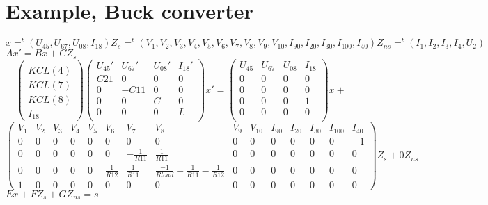 \documentclass[10pt]{article}
\begin{document}
\section{Example, Buck converter}
\begin{figure}[h]
\centerline{
 \scalebox{1.0}{
    
 }
}\end{figure}
$x=^{t}(U_{45},U_{67},U_{08},I_{18}) Z_{s}=^{t}(V_{1},V_{2},V_{3},V_{4},V_{5},V_{6},V_{7},V_{8},V_{9},V_{10},I_{90},I_{20},I_{30},I_{100},I_{40})
Z_{ns}=^{t}(I_{1},I_{2},I_{3},I_{4},U_{2})$\\
\underline{$Ax'= Bx+CZ_{s}$}
\[\left(\begin{array}{c}
  \\
KCL(4)\\KCL(7)\\KCL(8)\\I_{18}
\end{array}\right)
\left(\begin{array}{cccc}
  U_{45}'&U_{67}'&U_{08}'&I_{18}'\\
  \hline
  C21&0&0&0\\
  0&-C11&0&0\\
  0&0&C&0\\
  0&0&0&L\\  
\end{array}\right)x'=
\left(\begin{array}{cccc}
  U_{45}&U_{67}&U_{08}&I_{18}\\
  \hline
  0&0&0&0\\
  0&0&0&0\\
  0&0&0&1\\
  0&0&0&0\\
\end{array}\right)x+\]
\[
\left(\begin{array}{ccccccccccccccc}
  V_{1}&V_{2}&V_{3}&V_{4}&V_{5}&V_{6}&V_{7}&V_{8}&V_{9}&V_{10}&I_{90}&I_{20}&I_{30}&I_{100}&I_{40}\\
  \hline
  0&0&0&0&0&0&0&0&0&0&0&0&0&0&-1\\
  0&0&0&0&0&0&-\frac{1}{R11}&\frac{1}{R11}&0&0&0&0&0&0&0\\
  0&0&0&0&0&\frac{1}{R12}&\frac{1}{R11}&\frac{-1}{Rload}-\frac{1}{R11}-\frac{1}{R12}&0&0&0&0&0&0&0\\
  1&0&0&0&0&0&0&0&0&0&0&0&0&0&0
\end{array}\right)Z_{s}+0Z_{ns}\]
\underline{$Ex+FZ_{s}+GZ_{ns}=s$}
\end{document}

